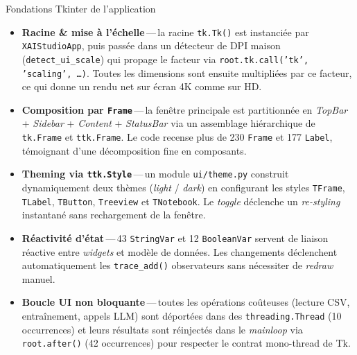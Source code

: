 \documentclass[11pt,a4paper]{report}
\begin{document}
\begin{techbox}{Fondations Tkinter de l'application}
\begin{itemize}
    \item \textbf{Racine \& mise \`a l'\'echelle}\,---\,la racine
        \texttt{tk.Tk()} est instanci\'ee par \texttt{XAIStudioApp},
        puis pass\'ee dans un d\'etecteur de DPI maison
        (\texttt{detect\_ui\_scale}) qui propage le facteur via
        \texttt{root.tk.call('tk', 'scaling', \dots)}. Toutes les
        dimensions sont ensuite multipli\'ees par ce facteur, ce qui
        donne un rendu net sur \'ecran 4K comme sur HD.

    \item \textbf{Composition par \texttt{Frame}}\,---\,la fen\^etre
        principale est partitionn\'ee en \textit{TopBar} +
        \textit{Sidebar} + \textit{Content} + \textit{StatusBar} via
        un assemblage hi\'erarchique de \texttt{tk.Frame} et
        \texttt{ttk.Frame}. Le code recense plus de 230 \texttt{Frame}
        et 177 \texttt{Label}, t\'emoignant d'une d\'ecomposition fine
        en composants.

    \item \textbf{Theming via \texttt{ttk.Style}}\,---\,un module
        \texttt{ui/theme.py} construit dynamiquement deux th\`emes
        (\textit{light} / \textit{dark}) en configurant les styles
        \texttt{TFrame}, \texttt{TLabel}, \texttt{TButton},
        \texttt{Treeview} et \texttt{TNotebook}. Le \textit{toggle}
        d\'eclenche un \textit{re-styling} instantan\'e sans
        rechargement de la fen\^etre.

    \item \textbf{R\'eactivit\'e d'\'etat}\,---\,43 \texttt{StringVar}
        et 12 \texttt{BooleanVar} servent de liaison r\'eactive entre
        \textit{widgets} et mod\`ele de donn\'ees. Les changements
        d\'eclenchent automatiquement les \texttt{trace\_add()}
        observateurs sans n\'ecessiter de \textit{redraw} manuel.

    \item \textbf{Boucle UI non bloquante}\,---\,toutes les
        op\'erations co\^uteuses (lecture CSV, entra\^inement,
        appels LLM) sont d\'eport\'ees dans des
        \texttt{threading.Thread} (10 occurrences) et leurs r\'esultats
        sont r\'einject\'es dans le \textit{mainloop} via
        \texttt{root.after()} (42 occurrences) pour respecter le
        contrat mono-thread de Tk.
\end{itemize}
\end{techbox}
\end{document}
